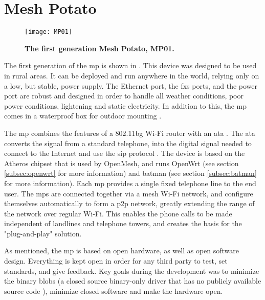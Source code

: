 \section{Mesh Potato}

\begin{figure}[b]
  \centering
      \texttt{[image: MP01]}
  \caption [MP01]{\textbf{The first generation Mesh Potato, MP01.}}
  \label{fig:MP01}
\end{figure}

The first generation of the \gls{mp} is shown in . This device was designed to be used in rural areas. It can be deployed and run anywhere in the world, relying only on a low, but stable, power supply. The Ethernet port, the \gls{fxs} ports, and the power port are robust and designed in order to handle all weather conditions, poor power conditions, lightening and static electricity. In addition to this, the \gls{mp} comes in a waterproof box for outdoor mounting \cite{background}.

The \gls{mp} combines the features of a 802.11bg Wi-Fi router with an \gls{ata} \cite{MP}. The \gls{ata} converts the signal from a standard telephone, into the digital signal needed to connect to the Internet and use the \gls{sip} protocol \cite{MParticle}. The device is based on the Atheros chipset that is used by OpenMesh, and runs OpenWrt (see section \ref{subsec:openwrt} for more information) and \gls{batman} (see section \ref{subsec:batman} for more information). Each \gls{mp} provides a single fixed telephone line to the end user. The \glspl{mp} are connected together via a mesh Wi-Fi network, and configure themselves automatically to form a \gls{p2p} network, greatly extending the range of the network over regular Wi-Fi. This enables the phone calls to be made independent of landlines and telephone towers, and creates the basis for the "plug-and-play" solution. 

As mentioned, the \gls{mp} is based on open hardware, as well as open software design. Everything is kept open in order for any third party to test, set standards, and give feedback. Key goals during the development was to minimize the binary blobs (a closed source binary-only driver that has no publicly available source code \cite{binaryBolb}), minimize closed software and make the hardware open. 

